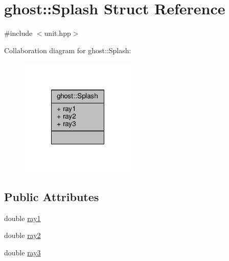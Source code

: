 \hypertarget{structghost_1_1Splash}{\section{ghost\-:\-:Splash Struct Reference}
\label{structghost_1_1Splash}
}


{\ttfamily \#include $<$unit.\-hpp$>$}



Collaboration diagram for ghost\-:\-:Splash\-:
\nopagebreak
\begin{figure}[H]
\begin{center}
\leavevmode
\includegraphics[width=156pt]{structghost_1_1Splash__coll__graph}
\end{center}
\end{figure}
\subsection*{Public Attributes}
\begin{DoxyCompactItemize}
\item 
double \hyperlink{structghost_1_1Splash_a283c04c8236bb2763dc8de33764cce7d}{ray1}
\item 
double \hyperlink{structghost_1_1Splash_ae5b63d9f92f4c1f19e24c4a0879512e9}{ray2}
\item 
double \hyperlink{structghost_1_1Splash_a2f90ec4779df2286e16d23fedb724fa3}{ray3}
\end{DoxyCompactItemize}


